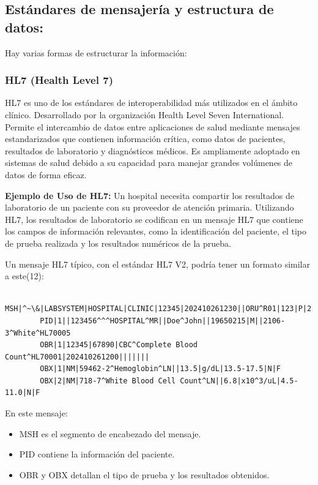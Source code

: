 \documentclass[12pt, a4paper, twoside]{article}
\begin{document}
	
	\subsection{Estándares de mensajería y estructura de datos:}
	
	Hay varias formas de estructurar la información:
	
	\subsubsection{HL7 (Health Level 7)} 
	HL7 es uno de los estándares de interoperabilidad más utilizados en el ámbito clínico. Desarrollado por la organización Health Level Seven International. Permite el intercambio de datos entre aplicaciones de salud mediante mensajes estandarizados que contienen información crítica, como datos de pacientes, resultados de laboratorio y diagnósticos médicos. Es ampliamente adoptado en sistemas de salud debido a su capacidad para manejar grandes volúmenes de datos de forma eficaz. 
	
	\textbf{Ejemplo de Uso de HL7:} Un hospital necesita compartir los resultados de laboratorio de un paciente con su proveedor de atención primaria. Utilizando HL7, los resultados de laboratorio se codifican en un mensaje HL7 que contiene los campos de información relevantes, como la identificación del paciente, el tipo de prueba realizada y los resultados numéricos de la prueba.
	
	Un mensaje HL7 típico, con el estándar HL7 V2, podría tener un formato similar a este(12):
	
	\begin{verbatim}
		MSH|^~\&|LABSYSTEM|HOSPITAL|CLINIC|12345|202410261230||ORU^R01|123|P|2.3
		PID|1||123456^^^HOSPITAL^MR||Doe^John||19650215|M||2106-3^White^HL70005
		OBR|1|12345|67890|CBC^Complete Blood Count^HL70001|202410261200|||||||
		OBX|1|NM|59462-2^Hemoglobin^LN||13.5|g/dL|13.5-17.5|N|F
		OBX|2|NM|718-7^White Blood Cell Count^LN||6.8|x10^3/uL|4.5-11.0|N|F
	\end{verbatim}
	
	
	
	En este mensaje:
	\begin{itemize}
		\item MSH es el segmento de encabezado del mensaje.
		\item PID contiene la información del paciente.
		\item OBR y OBX detallan el tipo de prueba y los resultados obtenidos.
	\end{itemize}
	
\end{document}
